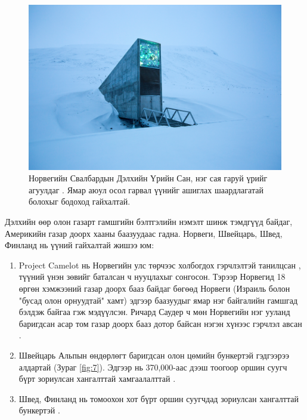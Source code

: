 \documentclass[10pt,twocolumn,letterpaper]{article}
\begin{document}
\begin{figure}[t]
\begin{center}
\includegraphics[width=1\linewidth]{svalbard.jpg}
\end{center}
   \caption{Норвегийн Свалбардын Дэлхийн Үрийн Сан, нэг сая гаруй үрийг агуулдаг \cite{24}. Ямар аюул осол гарвал үүнийг ашиглах шаардлагатай болохыг бодоход гайхалтай.}
\label{fig:8}
\label{fig:onecol}
\end{figure}

Дэлхийн өөр олон газарт гамшгийн бэлтгэлийн нэмэлт шинж тэмдгүүд байдаг, Америкийн газар доорх хааны баазуудаас гадна. Норвеги, Швейцарь, Швед, Финланд нь үүний гайхалтай жишээ юм:

\begin{flushleft}
\begin{enumerate}
    \item Project Camelot нь Норвегийн улс төрчээс холбогдох гэрчлэлтэй танилцсан \cite{25,26}, түүний үнэн зөвийг баталсан ч нууцлахыг сонгосон. Тэрээр Норвегид 18 өргөн хэмжээний газар доорх бааз байдаг бөгөөд Норвеги (Израиль болон "бусад олон орнуудтай" хамт) эдгээр баазуудыг ямар нэг байгалийн гамшгад бэлдэж байгаа гэж мэдүүлсэн. Ричард Саудер ч мөн Норвегийн нэг ууланд баригдсан асар том газар доорх бааз дотор байсан нэгэн хүнээс гэрчлэл авсан \cite{22}.
    \item Швейцарь Альпын өндөрлөгт баригдсан олон цөмийн бункертэй гэдгээрээ алдартай (Зураг \ref{fig:7}). Эдгээр нь 370,000-аас дээш тоогоор оршин суугч бүрт зориулсан хангалттай хамгаалалттай \cite{27}.
    \item Швед, Финланд нь томоохон хот бүрт оршин суугчдад зориулсан хангалттай бункертэй \cite{27}.
\end{enumerate}
\end{flushleft}
\end{document}
